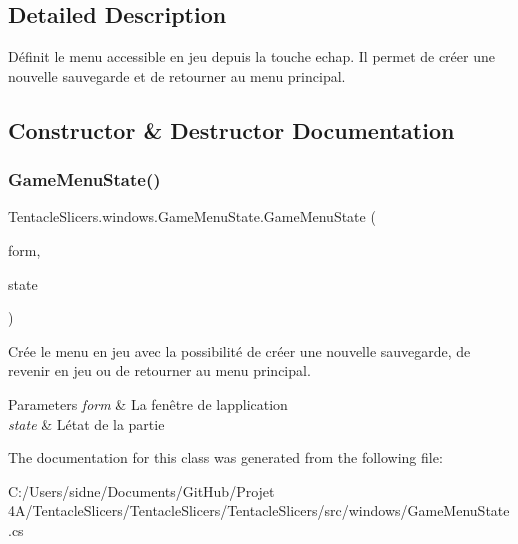 \subsection{Detailed Description}
Définit le menu accessible en jeu depuis la touche echap. Il permet de créer une nouvelle sauvegarde et de retourner au menu principal. 



\subsection{Constructor \& Destructor Documentation}
\mbox{\label{class_tentacle_slicers_1_1windows_1_1_game_menu_state_ae27e4df91ed86b51f7b89b3f368db912}} 
\subsubsection{\texorpdfstring{Game\+Menu\+State()}{GameMenuState()}}
{\footnotesize\ttfamily Tentacle\+Slicers.\+windows.\+Game\+Menu\+State.\+Game\+Menu\+State (\begin{DoxyParamCaption}\item[{\hyperlink{class_tentacle_slicers_1_1windows_1_1_main_form}{Main\+Form}}]{form,  }\item[{\hyperlink{class_tentacle_slicers_1_1windows_1_1_windows_state}{Windows\+State}}]{state }\end{DoxyParamCaption})}



Crée le menu en jeu avec la possibilité de créer une nouvelle sauvegarde, de revenir en jeu ou de retourner au menu principal. 


\begin{DoxyParams}{Parameters}
{\em form} & La fenêtre de l\textquotesingle{}application \\
\hline
{\em state} & L\textquotesingle{}état de la partie \\
\hline
\end{DoxyParams}


The documentation for this class was generated from the following file\+:\begin{DoxyCompactItemize}
\item 
C\+:/\+Users/sidne/\+Documents/\+Git\+Hub/\+Projet 4\+A/\+Tentacle\+Slicers/\+Tentacle\+Slicers/\+Tentacle\+Slicers/src/windows/Game\+Menu\+State.\+cs\end{DoxyCompactItemize}
